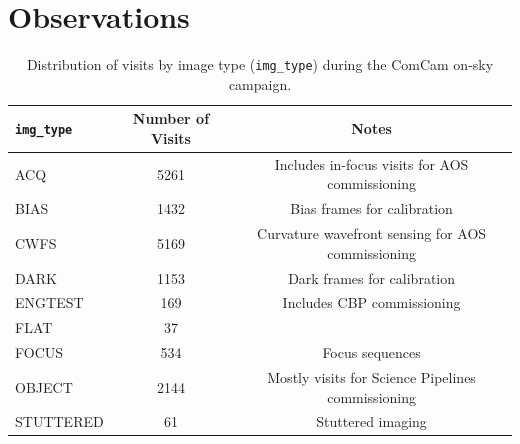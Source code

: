 \section{Observations}
\label{sec:observations}

\begin{table}
    \centering
    \begin{tabular}{@{}lcc@{}}
    \textbf{\texttt{img\_type}} & \textbf{Number of Visits} & \textbf{Notes} \\
    \hline
    ACQ & 5261 & Includes in-focus visits for AOS commissioning \\
    BIAS & 1432 & Bias frames for calibration \\
    CWFS & 5169 & Curvature wavefront sensing for AOS commissioning \\
    DARK & 1153 & Dark frames for calibration \\
    ENGTEST & 169 & Includes CBP commissioning \\
    FLAT & 37 & \\
    FOCUS & 534 & Focus sequences \\
    OBJECT & 2144 & Mostly visits for Science Pipelines commissioning \\
    STUTTERED & 61 & Stuttered imaging \\
    \end{tabular}
    \caption{Distribution of visits by image type (\texttt{img\_type}) during the ComCam on-sky campaign.}
    \label{tab:img_type}
\end{table}









